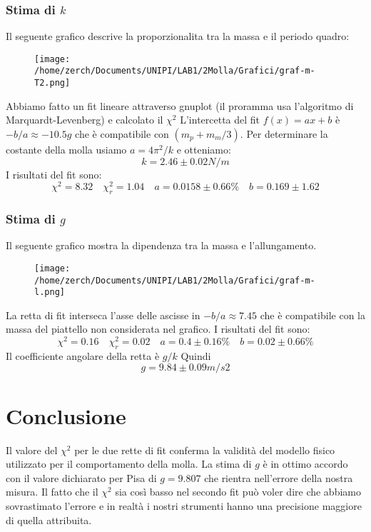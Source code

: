 \documentclass[a4paper,10pt]{article}
\begin{document}
\subsubsection{Stima di $k$}
Il seguente grafico descrive la proporzionalita tra la massa e il periodo quadro:

\begin{figure}[!htb]
\begin{center}
\texttt{[image: /home/zerch/Documents/UNIPI/LAB1/2Molla/Grafici/graf-m-T2.png]}
\end{center}
\end{figure}
Abbiamo fatto un fit lineare attraverso gnuplot (il proramma usa l'algoritmo di Marquardt-Levenberg) e calcolato il $\chi^2$
L'intercetta del fit $f(x)=ax+b$ è $-b/a\approx -10.5g$ che è compatibile con $(m_p+m_m/3)$.
Per determinare la costante della molla usiamo $a=4\pi^2/k$ e otteniamo: 
\begin{equation}
k=2.46\pm0.02 N/m
\end{equation}
I risultati del fit sono:
\begin{equation}
 \chi^2=8.32  \quad \chi^2_r=1.04 \quad  a=0.0158\pm0.66\%	\quad  b=0.169\pm 1.62
\end{equation}



\subsubsection{Stima di $g$}
Il seguente grafico mostra la dipendenza tra la massa e l'allungamento.
\begin{figure}[!htb]
\begin{center}
\texttt{[image: /home/zerch/Documents/UNIPI/LAB1/2Molla/Grafici/graf-m-l.png]}
\end{center}
\end{figure}
La retta di fit interseca l'asse delle ascisse in $-b/a\approx7.45$ che è compatibile con la massa del piattello non considerata nel grafico.
I risultati del fit sono:
\begin{equation}
\chi^2=0.16 \quad \chi^2_r=0.02 \quad a=0.4\pm0.16\% \quad b=0.02\pm0.66\%
\end{equation}
Il coefficiente angolare della retta è $g/k$
Quindi 
\begin{equation}
g=9.84\pm 0.09 m/s2
\end{equation}


\section{Conclusione}
 Il valore del $\chi^2$ per le due rette di fit conferma  la validità del modello fisico utilizzato per il comportamento della molla. La stima di $g$ è in ottimo accordo con il valore dichiarato per Pisa di $g=9.807$ che rientra nell'errore della nostra misura. Il fatto che il $\chi^2$ sia così basso nel secondo fit può voler dire che abbiamo sovrastimato l'errore e in realtà i nostri strumenti hanno una precisione maggiore di quella attribuita.
\end{document}
